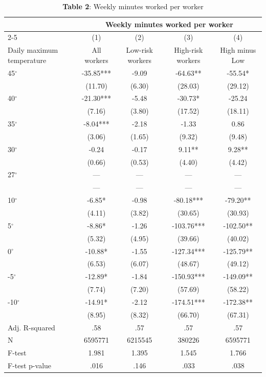 \begin{table}[H]
\centering
\caption{\textbf{Table 2}: Weekly minutes worked per worker}
\begin{tabular}{lcccc}
\hline\hline
 & \multicolumn{4}{c}{Weekly minutes worked per worker} \\
\cline{2-5}
 & (1) & (2) & (3) & (4) \\
Daily maximum temperature & All workers & Low-risk workers & High-risk workers & High minus Low \\
\hline
45$^\circ$ & -35.85*** & -9.09 & -64.63** & -55.54* \\
 & (11.70) & (6.30) & (28.03) & (29.12) \\
40$^\circ$ & -21.30*** & -5.48 & -30.73* & -25.24 \\
 & (7.16) & (3.80) & (17.52) & (18.11) \\
35$^\circ$ & -8.04*** & -2.18 & -1.33 & 0.86 \\
 & (3.06) & (1.65) & (9.32) & (9.48) \\
30$^\circ$ & -0.24 & -0.17 & 9.11** & 9.28** \\
 & (0.66) & (0.53) & (4.40) & (4.42) \\
27$^\circ$ & --- & --- & --- & --- \\
 & --- & --- & --- & --- \\
10$^\circ$ & -6.85* & -0.98 & -80.18*** & -79.20** \\
 & (4.11) & (3.82) & (30.65) & (30.93) \\
5$^\circ$ & -8.86* & -1.26 & -103.76*** & -102.50** \\
 & (5.32) & (4.95) & (39.66) & (40.02) \\
0$^\circ$ & -10.88* & -1.55 & -127.34*** & -125.79** \\
 & (6.53) & (6.07) & (48.67) & (49.12) \\
-5$^\circ$ & -12.89* & -1.84 & -150.93*** & -149.09** \\
 & (7.74) & (7.20) & (57.69) & (58.22) \\
-10$^\circ$ & -14.91* & -2.12 & -174.51*** & -172.38** \\
 & (8.95) & (8.32) & (66.70) & (67.31) \\
\hline
Adj. R-squared & .58 & .57 & .57 & .57 \\
N & 6595771 & 6215545 & 380226 & 6595771 \\
F-test & 1.981 & 1.395 & 1.545 & 1.766 \\
F-test p-value & .016 & .146 & .033 & .038 \\
\hline\hline
\end{tabular}
\end{table}
